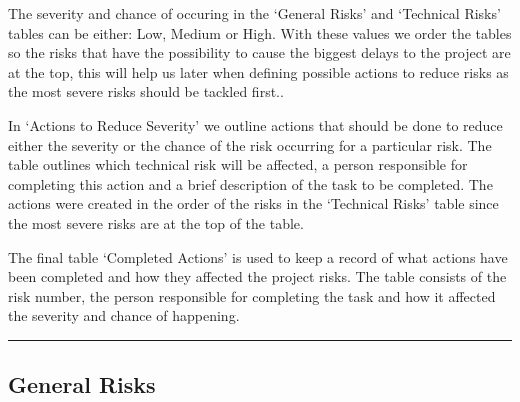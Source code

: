 \documentclass[
  paper=a4,
  ,captions=tableheading
]{scrartcl}
\begin{document}
The severity and chance of occuring in the `General Risks' and
`Technical Risks' tables can be either: Low, Medium or High. With these
values we order the tables so the risks that have the possibility to
cause the biggest delays to the project are at the top, this will help
us later when defining possible actions to reduce risks as the most
severe risks should be tackled first..

In `Actions to Reduce Severity' we outline actions that should be done
to reduce either the severity or the chance of the risk occurring for a
particular risk. The table outlines which technical risk will be
affected, a person responsible for completing this action and a brief
description of the task to be completed. The actions were created in the
order of the risks in the `Technical Risks' table since the most severe
risks are at the top of the table.

The final table `Completed Actions' is used to keep a record of what
actions have been completed and how they affected the project risks. The
table consists of the risk number, the person responsible for completing
the task and how it affected the severity and chance of happening.

\begin{center}\rule{0.5\linewidth}{0.5pt}\end{center}

\hypertarget{general-risks}{%
\subsection{General Risks}\label{general-risks}}
\end{document}
